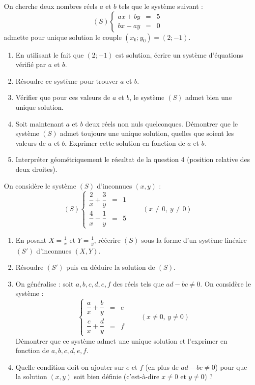 \documentclass[11pt]{article}
\begin{document}
\begin{exercice}
On cherche deux nombres réels $a$ et $b$ tels que le système suivant :
\[
(S) \left\{ \begin{array}{rcl}
ax + by &=& 5 \\
bx - ay &=& 0
\end{array} \right.
\]
admette pour unique solution le couple $(x_0 ; y_0) = (2 ; -1)$.
\begin{enumerate}
    \item En utilisant le fait que $(2 ; -1)$ est solution, écrire un système d'équations vérifié par $a$ et $b$.
    \item Résoudre ce système pour trouver $a$ et $b$.
    \item Vérifier que pour ces valeurs de $a$ et $b$, le système $(S)$ admet bien une unique solution.
    \item Soit maintenant $a$ et $b$ deux réels non nuls quelconques. Démontrer que le système $(S)$ admet toujours une unique solution, quelles que soient les valeurs de $a$ et $b$. Exprimer cette solution en fonction de $a$ et $b$.
    \item Interpréter géométriquement le résultat de la question 4 (position relative des deux droites).
\end{enumerate}
\end{exercice}

\begin{exercice}
On considère le système $(S)$ d'inconnues $(x, y)$ :
\[
(S) \left\{ \begin{array}{rcl}
\dfrac{2}{x} + \dfrac{3}{y} &=& 1 \\[6pt]
\dfrac{4}{x} - \dfrac{1}{y} &=& 5
\end{array} \right. \qquad (x \neq 0,\ y \neq 0)
\]
\begin{enumerate}
    \item En posant $X = \frac{1}{x}$ et $Y = \frac{1}{y}$, réécrire $(S)$ sous la forme d'un système linéaire $(S')$ d'inconnues $(X, Y)$.
    \item Résoudre $(S')$ puis en déduire la solution de $(S)$.
    \item On généralise : soit $a, b, c, d, e, f$ des réels tels que $ad - bc \neq 0$. On considère le système :
    \[
    \left\{ \begin{array}{rcl}
    \dfrac{a}{x} + \dfrac{b}{y} &=& e \\[6pt]
    \dfrac{c}{x} + \dfrac{d}{y} &=& f
    \end{array} \right. \qquad (x \neq 0,\ y \neq 0)
    \]
    Démontrer que ce système admet une unique solution et l'exprimer en fonction de $a, b, c, d, e, f$.
    \item Quelle condition doit-on ajouter sur $e$ et $f$ (en plus de $ad-bc \neq 0$) pour que la solution $(x, y)$ soit bien définie (c'est-à-dire $x \neq 0$ et $y \neq 0$) ?
\end{enumerate}
\end{exercice}
\end{document}
